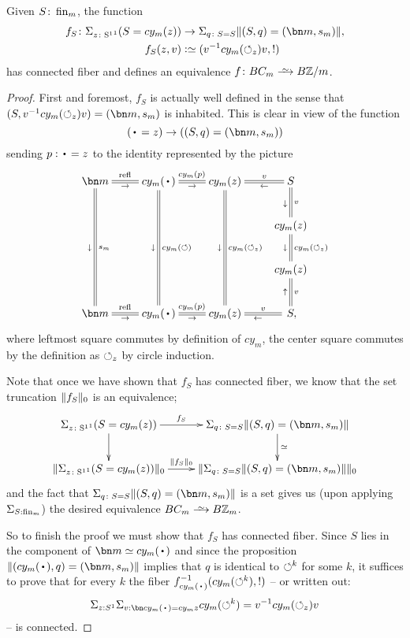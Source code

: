 \begin{example}
\begin{lemma}
  \label{lem:CmisisotoZ/m}
  Given $S\colon\fin_m$, the function
  \begin{align*}
    f_S\colon\Sigma_{z\colon\Sc^1}(S=cy_m(z))&\to \Sigma_{q\colon S=S}\Trunc{(S,q)=(\bn m,s_m)},\\
 f_S(z,v)&\defequi (v^{-1}cy_m(\Sloop_z)v,!)
  \end{align*}
  has connected fiber and defines
 an equivalence $f\colon BC_m\we B\ZZ/m$.
\end{lemma}
\begin{proof}
  First and foremost, $f_S$ is actually well defined in the sense that $(S,v^{-1}cy_m(\Sloop_z)v)=(\bn m,s_m)$ is inhabited.
  This is clear in view of the function
  $$(\base =z)\to((S,q)=(\bn m,s_m))$$
  sending $p:\base= z$ to the identity represented by the picture
  $$\xymatrix{
    \bn m\ar@{=}[ddd]^{s_m}_{\downarrow}\ar@{=}[r]^-{\refl{} }_-\to&
    cy_m(\base)\ar@{=}[ddd]^{cy_m(\Sloop)}_{\downarrow}\ar@{=}[r]^{cy_m(p)}_-\to&
    cy_m(z)\ar@{=}[ddd]^{cy_m(\Sloop_z)}_{\downarrow}\ar@{=}[r]^-v_-\gets&
    S\ar@{=}[d]^-v_{\downarrow}\\
    &&&cy_m(z)\ar@{=}[d]^{cy_m(\Sloop_z)}_{\downarrow}\\
     &&&cy_m(z)\ar@{=}[d]^-v_{\uparrow}\\
     \bn m\ar@{=}[r]^-{\refl{} }_-\to& cy_m(\base)\ar@{=}[r]^{cy_m(p)}_-\to&cy_m(z)\ar@{=}[r]^-v_\gets&\,S,}
  $$
  where leftmost square commutes by definition of $cy_m$, the center square commutes by the definition as $\circlearrowleft_z$ by circle induction.

  Note that  once we have shown that $f_S$ has connected fiber, we know that the set truncation $\lVert f_S\rVert_0$ is an equivalence;
  $$\xymatrix{\Sigma_{z\colon\Sc^1}(S=cy_m(z))\ar[r]^-{f_S}\ar[d]& \Sigma_{q\colon S=S}\Trunc{(S,q)=(\bn m,s_m)}\ar[d]^{\simeq}\\
 \Trunc{\Sigma_{z\colon\Sc^1}(S=cy_m(z))}_0\ar[r]^-{\Trunc{f_S}_0}& \Trunc{\Sigma_{q\colon S=S}\Trunc{(S,q)=(\bn m,s_m)}}_0 }
  $$ and the fact that $\Sigma_{q\colon S=S}\Trunc{(S,q)=(\bn m,s_m)}$ is a set gives us (upon applying $\Sigma_{S:\fin_m}$) the desired equivalence $BC_m\we B\ZZ_m$.

  So to finish the proof we must show that $f_S$ has connected fiber.
  Since $S$ lies in the component of $\bn m\oldequiv cy_m(\base)$ and since the proposition $\Trunc{(cy_m(\base),q)=(\bn m,s_m)}$ implies that $q$ is identical to $\circlearrowleft^k$ for some $k$, it suffices to prove that for every $k$ the fiber
  $f_{cy_m(\base)}^{-1}(cy_m(\Sloop^k),!)$ -- or written out:
  $$\Sigma_{z:S^1}\Sigma_{v:\bn cy_m(\base)=cy_m z}cy_m(\Sloop^k)=v^{-1}cy_m(\Sloop_z)v$$
   -- is connected.


\end{proof}
\end{example}
